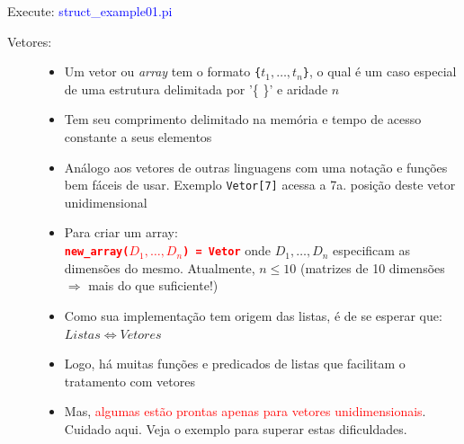 \begin{frame} [allowframebreaks=0.9]
\begin{description}
    \end{description}
     
     Execute: \textcolor{blue}{struct\_example01.pi}\\
         
     
     \newpage
     
     
    \begin{description}      
     
      
       \item[Vetores:] 
           
           \begin{itemize}
  \item Um vetor ou \textit{array} tem o formato \texttt{\{$t_1,…,t_n$\}}, o qual é um caso especial de uma estrutura delimitada por  '\{  \}’ e aridade $n$
  \item Tem seu comprimento delimitado na memória e tempo de acesso 
  constante a seus elementos
  
  \item Análogo aos vetores de outras linguagens com uma notação e funções bem fáceis de usar. Exemplo \texttt{Vetor[7]} acessa a 7a. posição deste vetor unidimensional
             
  \item Para criar um array:\\
       \textbf{\textcolor{red}{\texttt{new\_array($D_1, …, D_n$) = Vetor}}} onde $D_1, …, D_n$ especificam as dimensões do mesmo. Atualmente, $n \le 10$ (matrizes de  10 dimensões $\Rightarrow $ mais do que suficiente!) 
             
    \item Como sua implementação tem origem das listas, é de se esperar que: $Listas \Leftrightarrow Vetores$           
    
 \item Logo, há muitas funções e predicados de listas  que facilitam o tratamento  com vetores
    
  \item Mas, \textcolor{red}{algumas estão prontas apenas para vetores unidimensionais}. Cuidado aqui. Veja o exemplo para superar estas dificuldades.  
            
           \end{itemize}
 \end{description}
           

\end{frame}
